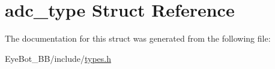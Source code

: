 \hypertarget{structadc__type}{\section{adc\-\_\-type \-Struct \-Reference}
\label{structadc__type}
}


\-The documentation for this struct was generated from the following file\-:\begin{DoxyCompactItemize}
\item 
\-Eye\-Bot\-\_\-\-B\-B/include/\hyperlink{types_8h}{types.\-h}\end{DoxyCompactItemize}
